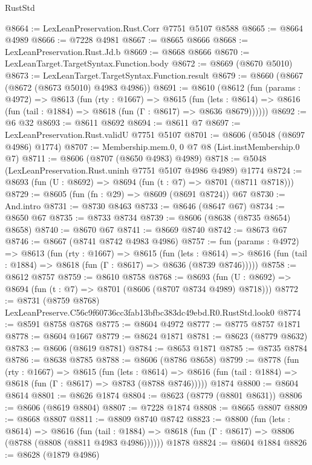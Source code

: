 \begin{lexlean}{RustStd}
\begin{coremodule}
@8664 := LexLeanPreservation.Rust.Corr @7751 @5107 @8588
@8665 := @8664 @4989
@8666 := @7228 @4981
@8667 := @8665 @8666
@8668 := LexLeanPreservation.Rust.Jd.b
@8669 := @8668 @8666
@8670 := LexLeanTarget.TargetSyntax.Function.body
@8672 := @8669 (@8670 @5010)
@8673 := LexLeanTarget.TargetSyntax.Function.result
@8679 := @8660 (@8667 (@8672 (@8673 @5010) @4983 @4986))
@8691 := @8610
    (@8612
      (fun (params : @4972) =>
      @8613
        (fun (rty : @1667) =>
        @8615
          (fun (lets : @8614) =>
          @8616 (fun (tail : @1884) => @8618 (fun (Γ : @8617) => @8636 @8679))))))
@8692 := @6 @32
@8693 := @8611 @8692
@8694 := @8611 @7
@8697 := LexLeanPreservation.Rust.validU @7751 @5107
@8701 := @8606 (@5048 (@8697 @4986) @1774)
@8707 := Membership.mem.{0, 0} @7 @8 (List.instMembership.{0} @7)
@8711 := @8606 (@8707 (@8650 @4983) @4989)
@8718 := @5048 (LexLeanPreservation.Rust.uninh @7751 @5107 @4986 @4989) @1774
@8724 := @8693 (fun (U : @8692) => @8694 (fun (t : @7) => @8701 (@8711 @8718)))
@8729 := @8605 (fun (fn : @29) => @8609 (@8691 @8724)) @67
@8730 := And.intro
@8731 := @8730 @8463
@8733 := @8646 (@8647 @67)
@8734 := @8650 @67
@8735 := @8733 @8734
@8739 := @8606 (@8638 (@8735 @8654) @8658)
@8740 := @8670 @67
@8741 := @8669 @8740
@8742 := @8673 @67
@8746 := @8667 (@8741 @8742 @4983 @4986)
@8757 := fun (params : @4972) =>
  @8613
    (fun (rty : @1667) =>
    @8615
      (fun (lets : @8614) =>
      @8616 (fun (tail : @1884) => @8618 (fun (Γ : @8617) => @8636 (@8739 @8746)))))
@8758 := @8612 @8757
@8759 := @8610 @8758
@8768 := @8693 (fun (U : @8692) => @8694 (fun (t : @7) => @8701 (@8606 (@8707 @8734 @4989) @8718)))
@8772 := @8731 (@8759 @8768) LexLeanPreserve.C56c9f60736cc3fab13bfbc383dc49ebd.R0.RustStd.look0
@8774 := @8591 @8758 @8768
@8775 := @8604 @4972
@8777 := @8775 @8757 @1871
@8778 := @8604 @1667
@8779 := @8624 @1871
@8781 := @8623 (@8779 @8632)
@8783 := @8606 (@8619 @8781)
@8784 := @8653 @1871
@8785 := @8735 @8784
@8786 := @8638 @8785
@8788 := @8606 (@8786 @8658)
@8799 := @8778
    (fun (rty : @1667) =>
    @8615
      (fun (lets : @8614) =>
      @8616 (fun (tail : @1884) => @8618 (fun (Γ : @8617) => @8783 (@8788 @8746)))))
    @1874
@8800 := @8604 @8614
@8801 := @8626 @1874
@8804 := @8623 (@8779 (@8801 @8631))
@8806 := @8606 (@8619 @8804)
@8807 := @7228 @1874
@8808 := @8665 @8807
@8809 := @8668 @8807
@8811 := @8809 @8740 @8742
@8823 := @8800
    (fun (lets : @8614) =>
    @8616
      (fun (tail : @1884) => @8618 (fun (Γ : @8617) => @8806 (@8788 (@8808 (@8811 @4983 @4986))))))
    @1878
@8824 := @8604 @1884
@8826 := @8628 (@1879 @4986)

\end{coremodule}
\end{lexlean}
